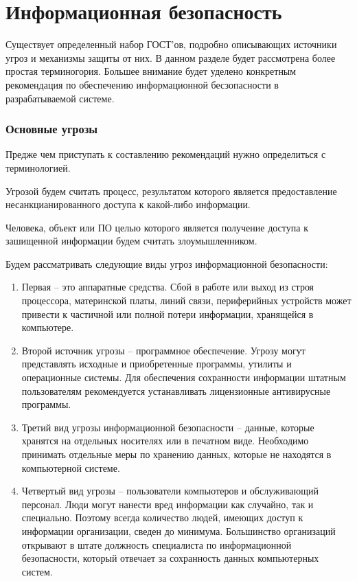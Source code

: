 \newpage
\chapter{Информационная безопасность}
Существует определенный набор ГОСТ’ов, подробно описывающих источники угроз и
механизмы защиты от них. В данном разделе будет рассмотрена более простая
терминогория. Большее внимание будет уделено конкретным рекомендация по
обеспечению информационной бесзопасности в разрабатываемой системе.

\subsection{Основные угрозы}
Предже чем приступать к составлению рекомендаций нужно определиться с
терминологией.

Угрозой будем считать процесс, результатом которого является предоставление
несанкцианированного доступа к какой-либо информации.

Человека, объект или ПО целью которого является получение доступа к зашищенной
информации будем считать злоумышленником.

Будем рассматривать следующие виды угроз информационной безопасности:

\begin{enumerate}
  \item Первая – это аппаратные средства. Сбой в работе или выход из строя процессора, материнской платы, линий связи, периферийных устройств может привести к частичной или полной потери информации, хранящейся в компьютере.
  \item Второй источник угрозы – программное обеспечение. Угрозу могут
представлять исходные и приобретенные программы, утилиты и операционные системы. Для обеспечения сохранности информации штатным пользователям рекомендуется устанавливать лицензионные антивирусные программы.
  \item Третий вид угрозы информационной безопасности – данные, которые хранятся
на отдельных носителях или в печатном виде. Необходимо принимать отдельные меры по хранению данных, которые не находятся в компьютерной системе.
  \item Четвертый вид угрозы – пользователи компьютеров и обслуживающий
персонал. Люди могут нанести вред информации как случайно, так и специально. Поэтому всегда количество людей, имеющих доступ к информации организации, сведен до минимума. Большинство организаций открывают в штате должность специалиста по информационной безопасности, который отвечает за сохранность данных компьютерных систем.
\end{enumerate}

